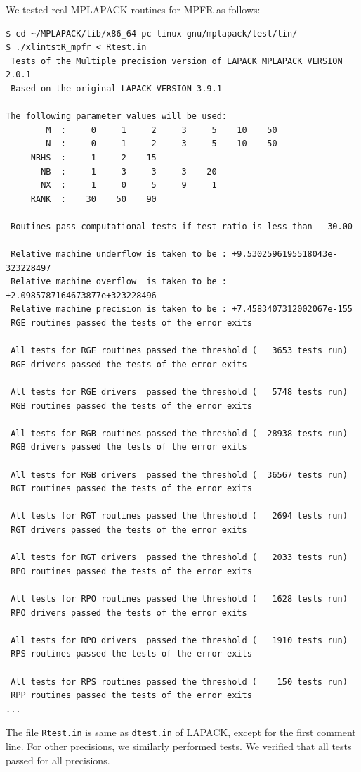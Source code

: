 \documentclass[12pt]{article}
\begin{document}
We tested real MPLAPACK routines for MPFR as follows:
\begin{verbatim}
$ cd ~/MPLAPACK/lib/x86_64-pc-linux-gnu/mplapack/test/lin/
$ ./xlintstR_mpfr < Rtest.in
 Tests of the Multiple precision version of LAPACK MPLAPACK VERSION 2.0.1
 Based on the original LAPACK VERSION 3.9.1

The following parameter values will be used:
        M  :     0     1     2     3     5    10    50
        N  :     0     1     2     3     5    10    50
     NRHS  :     1     2    15
       NB  :     1     3     3     3    20
       NX  :     1     0     5     9     1
     RANK  :    30    50    90

 Routines pass computational tests if test ratio is less than   30.00

 Relative machine underflow is taken to be : +9.5302596195518043e-323228497
 Relative machine overflow  is taken to be : +2.0985787164673877e+323228496
 Relative machine precision is taken to be : +7.4583407312002067e-155
 RGE routines passed the tests of the error exits

 All tests for RGE routines passed the threshold (   3653 tests run)
 RGE drivers passed the tests of the error exits

 All tests for RGE drivers  passed the threshold (   5748 tests run)
 RGB routines passed the tests of the error exits

 All tests for RGB routines passed the threshold (  28938 tests run)
 RGB drivers passed the tests of the error exits

 All tests for RGB drivers  passed the threshold (  36567 tests run)
 RGT routines passed the tests of the error exits

 All tests for RGT routines passed the threshold (   2694 tests run)
 RGT drivers passed the tests of the error exits

 All tests for RGT drivers  passed the threshold (   2033 tests run)
 RPO routines passed the tests of the error exits

 All tests for RPO routines passed the threshold (   1628 tests run)
 RPO drivers passed the tests of the error exits

 All tests for RPO drivers  passed the threshold (   1910 tests run)
 RPS routines passed the tests of the error exits

 All tests for RPS routines passed the threshold (    150 tests run)
 RPP routines passed the tests of the error exits
...
\end{verbatim}
The file {\tt Rtest.in} is same as {\tt dtest.in} of LAPACK, except for the first comment line.
For other precisions, we similarly performed tests. We verified that all tests passed for all precisions.
\end{document}
